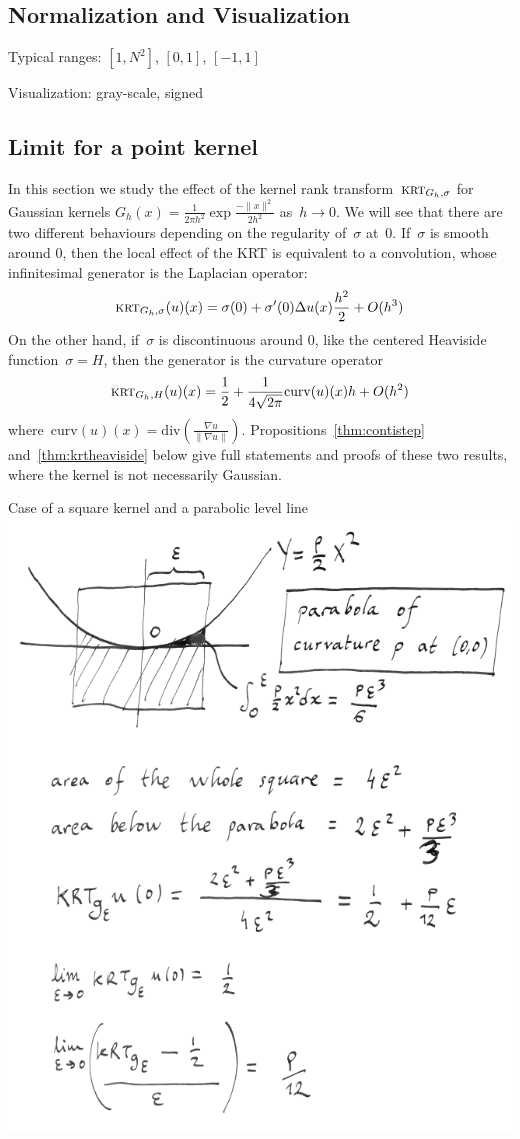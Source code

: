 \documentclass[12pt]{article}                  %
\begin{document}
\subsection{Normalization and Visualization}

Typical ranges: $[1,N^2]$, $[0,1]$, $[-1,1]$

Visualization: gray-scale, signed

\subsection{Limit for a point kernel}

In this section we study the effect of the kernel rank
transform~$\textsc{krt}_{G_h,\sigma}$ for Gaussian kernels
$G_h(x)=\frac1{2\pi h^2}\exp\frac{-\|x\|^2}{2h^2}$ as~$h\to 0$.
We will see that there are two different behaviours depending on the
regularity of~$\sigma$ at~$0$.  If~$\sigma$ is smooth around 0, then the
local effect of the KRT is equivalent to a convolution, whose infinitesimal
generator is the Laplacian operator:
\begin{equation}\label{eq:localsmooth}
	\textsc{krt}_{G_h,\sigma}(u)(x)=\sigma(0)+\sigma'(0)\Delta u(x)\frac{h^2}2+O(h^3)
\end{equation}
On the other hand, if~$\sigma$ is discontinuous around 0, like
the centered Heaviside function~$\sigma=H$, then the generator is the curvature
operator
\begin{equation}\label{eq:localheaviside}
	\textsc{krt}_{G_h,H}(u)(x)=\frac12+\frac1{4\sqrt{2\pi}}\mathrm{curv}(u)(x)h+O(h^2)
\end{equation}
where~$\mathrm{curv}(u)(x)=\mathrm{div}\left(\frac{\nabla u}{\|\nabla
u\|}\right)$.  
Propositions~\ref{thm:contistep} and~\ref{thm:krtheaviside}
below give full statements and proofs of these two results, where the kernel
is not necessarily Gaussian.




Case of a square kernel and a parabolic level line\\
\includegraphics[width=0.6\linewidth]{f/pcurv.png}
\end{document}
